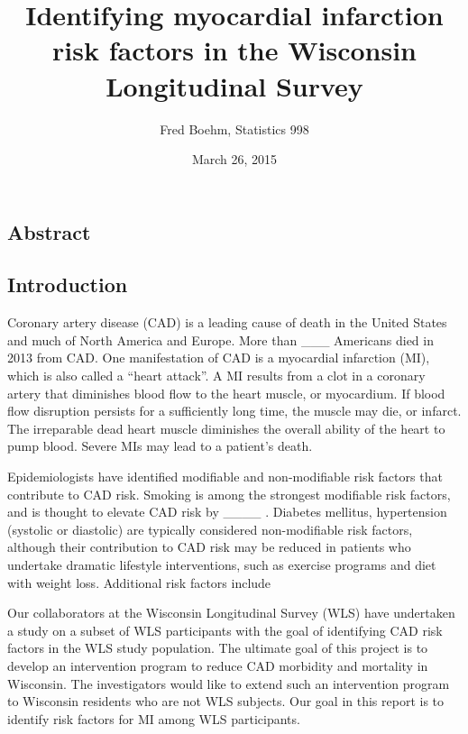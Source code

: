 \documentclass[11pt,]{article}
\title{Identifying myocardial infarction risk factors in the Wisconsin
Longitudinal Survey}
\author{Fred Boehm, Statistics 998}
\date{March 26, 2015}
\begin{document}
\maketitle


\listoftodos

\subsection{Abstract}\label{abstract}

\subsection{Introduction}\label{introduction}

Coronary artery disease (CAD) is a leading cause of death in the United
States and much of North America and Europe. More than \_\_\_
 Americans died in 2013 from CAD. One
manifestation of CAD is a myocardial infarction (MI), which is also
called a ``heart attack''. A MI results from a clot in a coronary artery
that diminishes blood flow to the heart muscle, or myocardium. If blood
flow disruption persists for a sufficiently long time, the muscle may
die, or infarct. The irreparable dead heart muscle diminishes the
overall ability of the heart to pump blood. Severe MIs may lead to a
patient's death.

Epidemiologists have identified modifiable and non-modifiable risk
factors that contribute to CAD risk. Smoking is among the strongest
modifiable risk factors, and is thought to elevate CAD risk by \_\_\_\_
.
Diabetes mellitus, hypertension (systolic or diastolic) are typically
considered non-modifiable risk factors, although their contribution to
CAD risk may be reduced in patients who undertake dramatic lifestyle
interventions, such as exercise programs and diet with weight loss.
Additional risk factors include

Our collaborators at the Wisconsin Longitudinal Survey (WLS) have
undertaken a study on a subset of WLS participants with the goal of
identifying CAD risk factors in the WLS study population. The ultimate
goal of this project is to develop an intervention program to reduce CAD
morbidity and mortality in Wisconsin. The investigators would like to
extend such an intervention program to Wisconsin residents who are not
WLS subjects. Our goal in this report is to identify risk factors for MI
among WLS participants.
\end{document}
